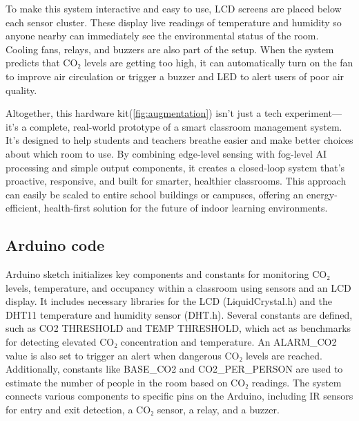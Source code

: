 To make this system interactive and easy to use, LCD screens are placed below each sensor cluster. These display live readings of temperature and humidity so anyone nearby can immediately see the environmental status of the room. Cooling fans, relays, and buzzers are also part of the setup. When the system predicts that CO₂ levels are getting too high, it can automatically turn on the fan to improve air circulation or trigger a buzzer and LED to alert users of poor air quality.

Altogether, this hardware kit(\ref{fig:augmentation}) isn’t just a tech experiment—it’s a complete, real-world prototype of a smart classroom management system. It’s designed to help students and teachers breathe easier and make better choices about which room to use. By combining edge-level sensing with fog-level AI processing and simple output components, it creates a closed-loop system that’s proactive, responsive, and built for smarter, healthier classrooms. This approach can easily be scaled to entire school buildings or campuses, offering an energy-efficient, health-first solution for the future of indoor learning environments.

\subsection{Arduino code}
Arduino sketch initializes key components and constants for monitoring CO₂ levels, temperature, and occupancy within a classroom using sensors and an LCD display. It includes necessary libraries for the LCD (LiquidCrystal.h) and the DHT11 temperature and humidity sensor (DHT.h). Several constants are defined, such as CO2 THRESHOLD and TEMP THRESHOLD, which act as benchmarks for detecting elevated CO₂ concentration and temperature. An ALARM\_CO2 value is also set to trigger an alert when dangerous CO₂ levels are reached. Additionally, constants like BASE\_CO2 and CO2\_PER\_PERSON are used to estimate the number of people in the room based on CO₂ readings. The system connects various components to specific pins on the Arduino, including IR sensors for entry and exit detection, a CO₂ sensor, a relay, and a buzzer.

